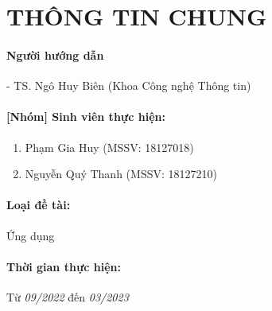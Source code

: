 \newpage

\section{THÔNG TIN CHUNG}

\paragraph{Người hướng dẫn}
\tab - TS. Ngô Huy Biên (Khoa Công nghệ Thông tin)    

\paragraph{[Nhóm] Sinh viên thực hiện:}
\begin{enumerate}
    \item Phạm Gia Huy (MSSV: 18127018)
    \item Nguyễn Quý Thanh (MSSV: 18127210)
\end{enumerate}

\paragraph{Loại đề tài:}
Ứng dụng

\paragraph{Thời gian thực hiện:}
Từ \textsl{09/2022} đến \textsl{03/2023}
